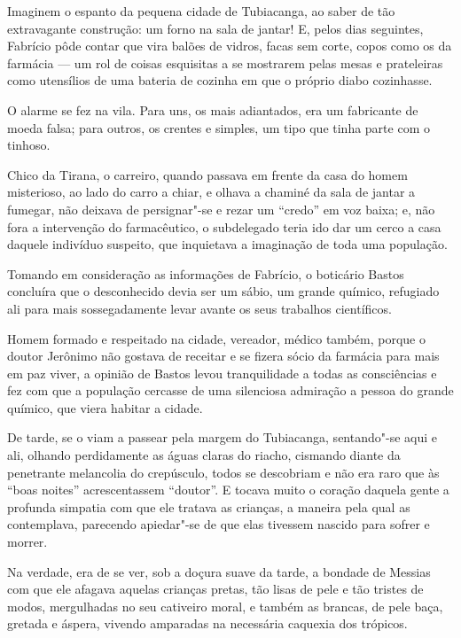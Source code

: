 Imaginem o espanto da pequena cidade de Tubiacanga, ao saber de tão
extravagante construção: um forno na sala de jantar! E, pelos dias
seguintes, Fabrício pôde contar que vira balões de vidros, facas sem
corte, copos como os da farmácia --- um rol de coisas esquisitas a se
mostrarem pelas mesas e prateleiras como utensílios de uma bateria de
cozinha em que o próprio diabo cozinhasse.

O alarme se fez na vila. Para uns, os mais adiantados, era um fabricante
de moeda falsa; para outros, os crentes e simples, um tipo que tinha
parte com o tinhoso.

Chico da Tirana, o carreiro, quando passava em frente da casa do homem
misterioso, ao lado do carro a chiar, e olhava a chaminé da sala de
jantar a fumegar, não deixava de persignar"-se e rezar um ``credo'' em voz
baixa; e, não fora a intervenção do farmacêutico, o subdelegado teria
ido dar um cerco a casa daquele indivíduo suspeito, que inquietava a
imaginação de toda uma população.

Tomando em consideração as informações de Fabrício, o boticário Bastos
concluíra que o desconhecido devia ser um sábio, um grande químico,
refugiado ali para mais sossegadamente levar avante os seus trabalhos
científicos.

Homem formado e respeitado na cidade, vereador, médico também, porque o
doutor Jerônimo não gostava de receitar e se fizera sócio da farmácia
para mais em paz viver, a opinião de Bastos levou tranquilidade a todas
as consciências e fez com que a população cercasse de uma silenciosa
admiração a pessoa do grande químico, que viera habitar a cidade.

De tarde, se o viam a passear pela margem do Tubiacanga, sentando"-se
aqui e ali, olhando perdidamente as águas claras do riacho, cismando
diante da penetrante melancolia do crepúsculo, todos se descobriam e não
era raro que às ``boas noites'' acrescentassem ``doutor''. E tocava muito o
coração daquela gente a profunda simpatia com que ele tratava as
crianças, a maneira pela qual as contemplava, parecendo apiedar"-se de
que elas tivessem nascido para sofrer e morrer.

Na verdade, era de se ver, sob a doçura suave da tarde, a bondade de
Messias com que ele afagava aquelas crianças pretas, tão lisas de pele e
tão tristes de modos, mergulhadas no seu cativeiro moral, e também as
brancas, de pele baça, gretada e áspera, vivendo amparadas na necessária
caquexia dos trópicos.


